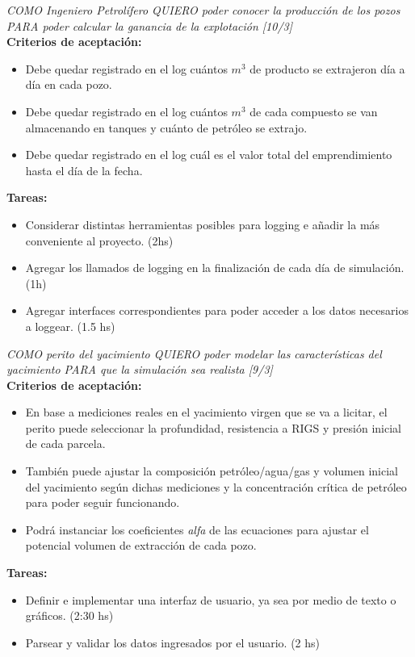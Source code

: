 \begin{tcolorbox}
\textit{COMO Ingeniero Petrolífero QUIERO poder conocer la producción de los pozos PARA poder calcular la ganancia de la explotación [10/3]}\\

\textbf{Criterios de aceptación:}
\begin{itemize}
	\item Debe quedar registrado en el log cuántos $m^3$ de producto se extrajeron día a día en cada pozo.
    \item Debe quedar registrado en el log cuántos $m^3$ de cada compuesto se van almacenando en tanques y cuánto de petróleo se extrajo. 
    \item Debe quedar registrado en el log cuál es el valor total del emprendimiento hasta el día de la fecha.  
\end{itemize}

\textbf{Tareas:}
\begin{itemize}
	\item Considerar distintas herramientas posibles para logging e añadir la más conveniente al proyecto. (2hs) 
    \item Agregar los llamados de logging en la finalización de cada día de simulación. (1h)
    \item Agregar interfaces correspondientes para poder acceder a los datos necesarios a loggear. (1.5 hs)  
\end{itemize}
\end{tcolorbox}

\begin{tcolorbox}
\textit{COMO perito del yacimiento QUIERO poder modelar las características del yacimiento PARA que la simulación sea realista [9/3]}\\

\textbf{Criterios de aceptación:}
\begin{itemize}
	\item En base a mediciones reales en el yacimiento virgen que se va a licitar, el perito puede seleccionar la profundidad, resistencia a RIGS y presión inicial de cada parcela.

    \item También puede ajustar la composición petróleo/agua/gas y volumen inicial del yacimiento según dichas mediciones y la concentración crítica de petróleo para poder seguir funcionando.

    \item Podrá instanciar los coeficientes \textit{alfa} de las ecuaciones para ajustar el potencial volumen de extracción de cada pozo.
\end{itemize}

\textbf{Tareas:}
\begin{itemize}
	\item Definir e implementar una interfaz de usuario, ya sea por medio de texto o gráficos. (2:30 hs)
    \item Parsear y validar los datos ingresados por el usuario. (2 hs)
\end{itemize}
\end{tcolorbox}
